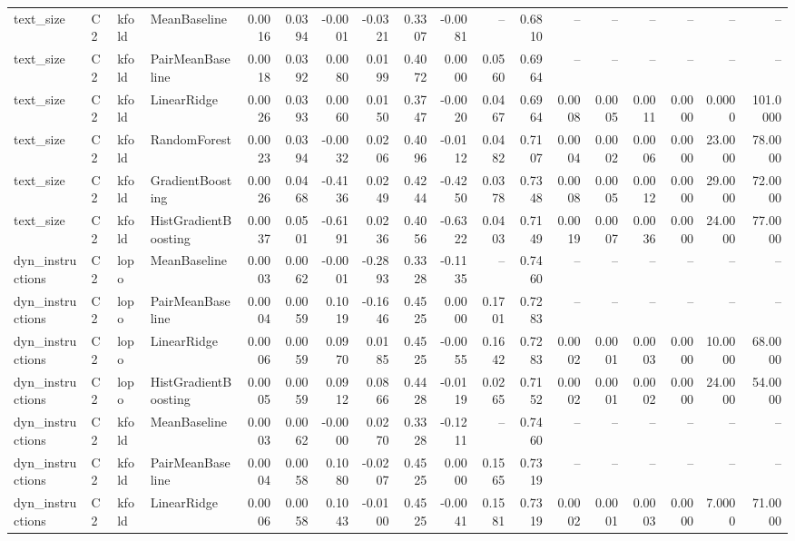 \begin{table}[t]
\begin{tabular}{llllrrrrrrrrrrrrrr}
text\_size & C2 & kfold & MeanBaseline & 0.0016 & 0.0394 & -0.0001 & -0.0321 & 0.3307 & -0.0081 & -- & 0.6810 & -- & -- & -- & -- & -- & -- \\
text\_size & C2 & kfold & PairMeanBaseline & 0.0018 & 0.0392 & 0.0080 & 0.0199 & 0.4072 & 0.0000 & 0.0560 & 0.6964 & -- & -- & -- & -- & -- & -- \\
text\_size & C2 & kfold & LinearRidge & 0.0026 & 0.0393 & 0.0060 & 0.0150 & 0.3747 & -0.0020 & 0.0467 & 0.6964 & 0.0008 & 0.0005 & 0.0011 & 0.0000 & 0.0000 & 101.0000 \\
text\_size & C2 & kfold & RandomForest & 0.0023 & 0.0394 & -0.0032 & 0.0206 & 0.4096 & -0.0112 & 0.0482 & 0.7107 & 0.0004 & 0.0002 & 0.0006 & 0.0000 & 23.0000 & 78.0000 \\
text\_size & C2 & kfold & GradientBoosting & 0.0026 & 0.0468 & -0.4136 & 0.0249 & 0.4244 & -0.4250 & 0.0378 & 0.7348 & 0.0008 & 0.0005 & 0.0012 & 0.0000 & 29.0000 & 72.0000 \\
text\_size & C2 & kfold & HistGradientBoosting & 0.0037 & 0.0501 & -0.6191 & 0.0236 & 0.4056 & -0.6322 & 0.0403 & 0.7149 & 0.0019 & 0.0007 & 0.0036 & 0.0000 & 24.0000 & 77.0000 \\
dyn\_instructions & C2 & lopo & MeanBaseline & 0.0003 & 0.0062 & -0.0001 & -0.2893 & 0.3328 & -0.1135 & -- & 0.7460 & -- & -- & -- & -- & -- & -- \\
dyn\_instructions & C2 & lopo & PairMeanBaseline & 0.0004 & 0.0059 & 0.1019 & -0.1646 & 0.4525 & 0.0000 & 0.1701 & 0.7283 & -- & -- & -- & -- & -- & -- \\
dyn\_instructions & C2 & lopo & LinearRidge & 0.0006 & 0.0059 & 0.0970 & 0.0185 & 0.4525 & -0.0055 & 0.1642 & 0.7283 & 0.0002 & 0.0001 & 0.0003 & 0.0000 & 10.0000 & 68.0000 \\
dyn\_instructions & C2 & lopo & HistGradientBoosting & 0.0005 & 0.0059 & 0.0912 & 0.0866 & 0.4428 & -0.0119 & 0.0265 & 0.7152 & 0.0002 & 0.0001 & 0.0002 & 0.0000 & 24.0000 & 54.0000 \\
dyn\_instructions & C2 & kfold & MeanBaseline & 0.0003 & 0.0062 & -0.0000 & 0.0270 & 0.3328 & -0.1211 & -- & 0.7460 & -- & -- & -- & -- & -- & -- \\
dyn\_instructions & C2 & kfold & PairMeanBaseline & 0.0004 & 0.0058 & 0.1080 & -0.0207 & 0.4525 & 0.0000 & 0.1565 & 0.7319 & -- & -- & -- & -- & -- & -- \\
dyn\_instructions & C2 & kfold & LinearRidge & 0.0006 & 0.0058 & 0.1043 & -0.0100 & 0.4525 & -0.0041 & 0.1581 & 0.7319 & 0.0002 & 0.0001 & 0.0003 & 0.0000 & 7.0000 & 71.0000 \\

\end{tabular}
\end{table}

